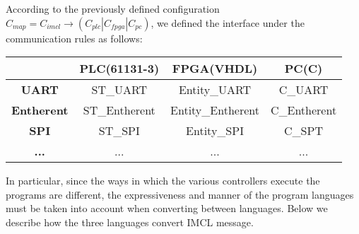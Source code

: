 According to the previously defined configuration $C_{map} = C_{imcl} \rightarrow (C_{plc} | C_{fpga} | C_{pc})$, we defined the interface under the communication rules as follows:

\begin{table}[!htb]
\centering
\small
    \begin{tabular}{|c|c|c|c|}
    \hline
    \textbf{ } & \textbf{PLC(61131-3)} & \textbf{FPGA(VHDL)} &  \textbf{PC(C)} \\
    \hline
    \textbf{UART}   & ST\_UART & Entity\_UART & C\_UART \\
    \textbf{Entherent} & ST\_Entherent & Entity\_Entherent & C\_Entherent \\
    \textbf{SPI} & ST\_SPI & Entity\_SPI & C\_SPT \\
    \textbf{...} & ... & ... & ... \\
    \hline
    \end{tabular}
\end{table}

In particular, since the ways in which the various controllers execute the programs are different, the expressiveness and manner of the program languages must be taken into account when converting between languages. Below we describe how the three languages convert IMCL message.

